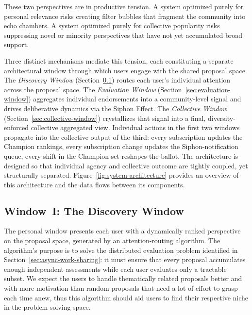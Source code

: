\documentclass[a4paper, 12pt, twoside]{iviathesis}
\begin{document}
These two perspectives are in productive tension. A system optimized purely for personal relevance risks creating filter bubbles that fragment the community into echo chambers. A system optimized purely for collective popularity risks suppressing novel or minority perspectives that have not yet accumulated broad support.

Three distinct mechanisms mediate this tension, each constituting a separate architectural window through which users engage with the shared proposal space. The \textit{Discovery Window} (Section~\ref{sec:personal-window}) routes each user's individual attention across the proposal space. The \textit{Evaluation Window} (Section~\ref{sec:evaluation-window}) aggregates individual endorsements into a community-level signal and drives deliberative dynamics via the Siphon Effect. The \textit{Collective Window} (Section~\ref{sec:collective-window}) crystallizes that signal into a final, diversity-enforced collective aggregated view. Individual actions in the first two windows propagate into the collective output of the third: every subscription updates the Champion rankings, every subscription change updates the Siphon-notification queue, every shift in the Champion set reshapes the ballot. The architecture is designed so that individual agency and collective outcome are tightly coupled, yet structurally separated. Figure~\ref{fig:system-architecture} provides an overview of this architecture and the data flows between its components.



\subsection{Window~I: The Discovery Window}
\label{sec:personal-window}

The personal window presents each user with a dynamically ranked perspective on the proposal space, generated by an attention-routing algorithm. The algorithm's purpose is to solve the distributed evaluation problem identified in Section~\ref{sec:async-work-sharing}: it must ensure that every proposal accumulates enough independent assessments while each user evaluates only a tractable subset. We expect the users to handle thematically related proposals better and with more motivation than random proposals that need a lot of effort to grasp each time anew, thus this algorithm should aid users to find their respective niche in the problem solving space.
\end{document}
